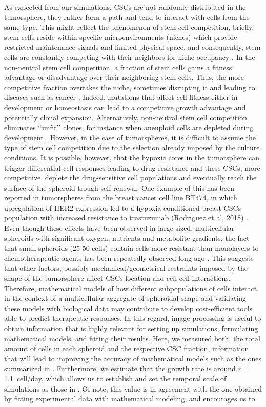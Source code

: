 \documentclass[fleqn,10pt]{wlscirep}
\begin{document}
As expected from our simulations, CSCs are not randomly distributed in the tumorsphere, they rather form a path and tend to interact with cells from the same type. This might reflect the phenomenon of stem cell competition, briefly, stem cells reside within specific microenvironments (niches) which provide restricted maintenance signals and limited physical space, and consequently, stem cells are constantly competing with their neighbors for niche occupancy \cite{Stines2013}. In the non-neutral stem cell competition, a fraction of stem cells gains a fitness advantage or disadvantage over their neighboring stem cells. Thus, the more competitive fraction overtakes the niche, sometimes disrupting it and leading to diseases such as cancer \cite{Johnston2009}. Indeed, mutations that affect cell fitness either in development or homeostasis can lead to a competitive growth advantage and potentially clonal expansion. Alternatively, non-neutral stem cell competition eliminates ‘‘unfit’’ clones, for instance when aneuploid cells are depleted during development \cite{Derks2023}. However, in the case of tumorspheres, it is difficult to assume the type of stem cell competition due to the selection already imposed by the culture conditions. It is possible, however, that the hypoxic cores in the tumorsphere can trigger differential cell responses leading to drug resistance \cite{Fisher2020} and these CSCs, more competitive, deplete the drug-sensitive cell populations and eventually reach the surface of the spheroid trough self-renewal. One example of this has been reported in tumorspheres from the breast cancer cell line BT474, in which upregulation of HER2 expression led to a hypoxia-conditioned breast CSCs population with increased resistance to trastuzumab (Rodriguez et al, 2018) \cite{}. Even though these effects have been observed in large sized, multicellular spheroids with significant oxygen, nutrients and metabolite gradients, the fact that small spheroids (25-50 cells) contain cells more resistant than monolayers to chemotherapeutic agents has been repeatedly observed long ago \cite{Olive1994}. This suggests that other factors, possibly mechanical/geometrical restraints imposed by the shape of the tumorsphere affect CSCs location and cell-cell interactions. Therefore, mathematical models of how different subpopulations of cells interact in the context of a multicellular aggregate of spheroidal shape and validating these models with biological data may contribute to develop cost-efficient tools able to predict therapeutic responses. In this regard, image processing is useful to obtain information that is highly relevant for setting up simulations, formulating mathematical models, and fitting their results. Here, we measured both, the total amount of cells in each spheroid and the respective CSC fraction, information that will lead to improving the accuracy of mathematical models such as the ones summarized in \cite{barberis2021diff}. Furthermore, we estimate that the growth rate is around $r=$\SI{1.1}{cell/day}, which allows us to establish and set the temporal scale of simulations as those in \cite{barberis2021percolation}. Of note, this value is in agreement with the one obtained by fitting experimental data with mathematical modeling\cite{benitez2021}, and encourages us to 
\end{document}
